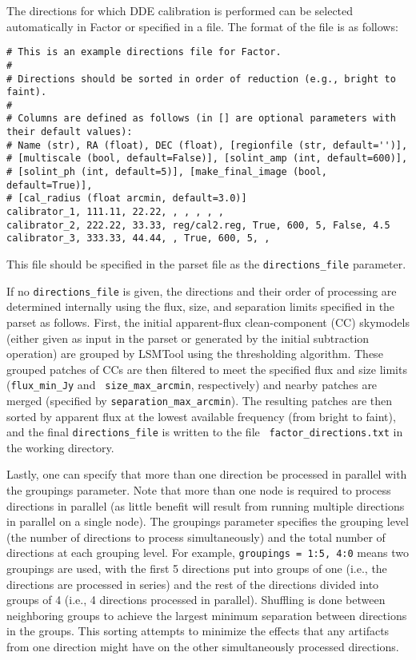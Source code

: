 \documentclass[structabstract]{article}
\begin{document}
The directions for which DDE calibration is performed can be selected
automatically in Factor or specified in a file. The format of the file is as
follows:

\begin{verbatim}
# This is an example directions file for Factor.
#
# Directions should be sorted in order of reduction (e.g., bright to faint).
#
# Columns are defined as follows (in [] are optional parameters with their default values):
# Name (str), RA (float), DEC (float), [regionfile (str, default='')],
# [multiscale (bool, default=False)], [solint_amp (int, default=600)],
# [solint_ph (int, default=5)], [make_final_image (bool, default=True)],
# [cal_radius (float arcmin, default=3.0)]
calibrator_1, 111.11, 22.22, , , , , ,
calibrator_2, 222.22, 33.33, reg/cal2.reg, True, 600, 5, False, 4.5
calibrator_3, 333.33, 44.44, , True, 600, 5, ,
\end{verbatim}
This file should be specified in the parset file as the {\tt directions\_file}
parameter.

If no {\tt directions\_file} is given, the directions and their order of
processing are determined internally using the flux, size, and separation limits
specified in the parset as follows. First, the initial apparent-flux
clean-component (CC) skymodels (either given as input in the parset or generated
by the initial subtraction operation) are grouped by LSMTool using the
thresholding algorithm. These grouped patches of CCs are then filtered to meet
the specified flux and size limits ({\tt flux\_min\_Jy} and {\tt
size\_max\_arcmin}, respectively) and nearby patches are merged (specified by
{\tt separation\_max\_arcmin}). The resulting patches are then sorted by
apparent flux at the lowest available frequency (from bright to faint), and the
final {\tt directions\_file} is written to the file {\tt
factor\_directions.txt} in the working directory.

Lastly, one can specify that more than one direction be processed in parallel
with the groupings parameter. Note that more than one node is required to
process directions in parallel (as little benefit will result from running
multiple directions in parallel on a single node). The groupings parameter
specifies the grouping level (the number of directions to process
simultaneously) and the total number of directions at each grouping level. For
example, {\tt groupings = 1:5, 4:0} means two groupings are used, with the first
5 directions put into groups of one (i.e., the directions are processed in
series) and the rest of the directions divided into groups of 4 (i.e., 4
directions processed in parallel). Shuffling is done between neighboring groups
to achieve the largest minimum separation between directions in the groups. This
sorting attempts to minimize the effects that any artifacts from one direction
might have on the other simultaneously processed directions.
\end{document}
